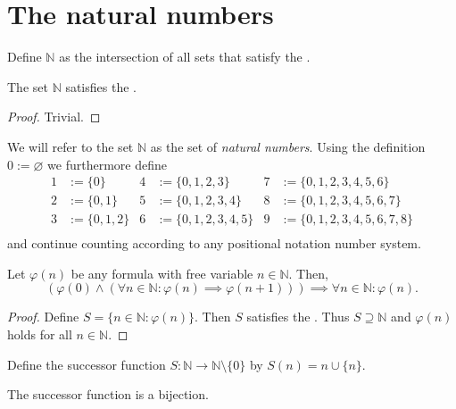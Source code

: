\documentclass[../../main.tex]{subfiles}
\begin{document}
\section{The natural numbers}
\begin{definition}
    Define $\mathbb{N}$ as the intersection of all sets that satisfy the .
\end{definition}
\begin{theorem}
    The set $\mathbb{N}$ satisfies the .
\end{theorem}
\begin{proof}
    Trivial.
\end{proof}
\begin{definition}
    We will refer to the set $\mathbb{N}$ as the set of \emph{natural numbers}. Using the definition $0:=\varnothing$ we furthermore define
    \begin{align*}
        1 & :=\{0\} & 4 & :=\{0,1,2,3\} & 7 & :=\{0,1,2,3,4,5,6\} \\
        2 & :=\{0,1\} & 5 & :=\{0,1,2,3,4\} & 8 & :=\{0,1,2,3,4,5,6,7\} \\
        3 & :=\{0,1,2\} & 6 & :=\{0,1,2,3,4,5\} & 9 & :=\{0,1,2,3,4,5,6,7,8\} \\
    \end{align*}
    and continue counting according to any positional notation number system.
\end{definition}
\begin{theorem}
    Let $\varphi(n)$ be any formula with free variable $n\in\mathbb{N}$. Then,
    \begin{equation*}
        (\varphi(0)\land(\forall n\in\mathbb{N}:\varphi(n)\implies\varphi(n+1)))\implies\forall n\in\mathbb{N}:\varphi(n).
    \end{equation*}
\end{theorem}
\begin{proof}
    Define $S=\{n\in\mathbb{N}:\varphi(n)\}$. Then $S$ satisfies the . Thus $S\supseteq\mathbb{N}$ and $\varphi(n)$ holds for all $n\in\mathbb{N}$.
\end{proof}
\begin{definition}[Succession]
    Define the successor function $S:\mathbb{N}\to\mathbb{N}\setminus\{0\}$ by $S(n)=n\cup\{n\}$.
\end{definition}
\begin{theorem}
    The successor function is a bijection.
\end{theorem}
\end{document}
